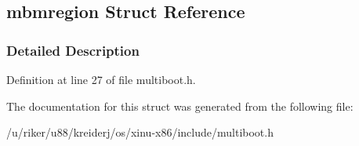 \hypertarget{structmbmregion}{}\subsection{mbmregion Struct Reference}
\label{structmbmregion}


\subsubsection{Detailed Description}


Definition at line 27 of file multiboot.\+h.



The documentation for this struct was generated from the following file\+:\begin{DoxyCompactItemize}
\item 
/u/riker/u88/kreiderj/os/xinu-\/x86/include/multiboot.\+h\end{DoxyCompactItemize}
